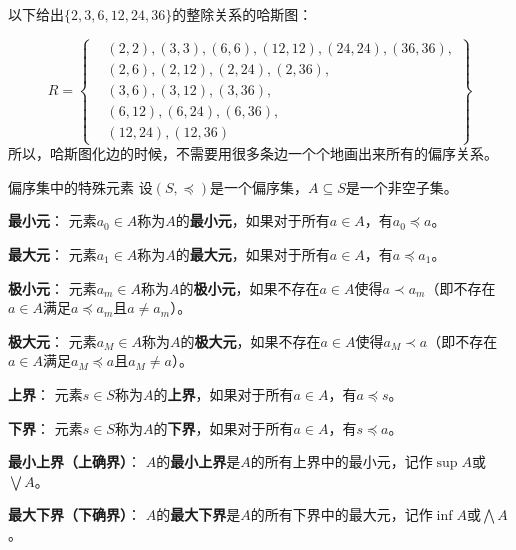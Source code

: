 以下给出$\{2,3,6,12,24,36\}$的整除关系的哈斯图：
\begin{figure}[!ht]
\centering
{}%
\end{figure}
\[
R = \left\{
\begin{aligned}
& (2,2), (3,3), (6,6), (12,12), (24,24), (36,36), \\
& (2,6), (2,12), (2,24), (2,36), \\
& (3,6), (3,12), (3,36), \\
& (6,12), (6,24), (6,36), \\
& (12,24), (12,36)
\end{aligned}
\right\}
\]
所以，哈斯图化边的时候，不需要用很多条边一个个地画出来所有的偏序关系。
\begin{definition}{偏序集中的特殊元素}{}
设$(S, \preccurlyeq)$是一个偏序集，$A \subseteq S$是一个非空子集。

\textbf{最小元}：
元素$a_0 \in A$称为$A$的\textbf{最小元}，如果对于所有$a \in A$，有$a_0 \preccurlyeq a$。

\textbf{最大元}：
元素$a_1 \in A$称为$A$的\textbf{最大元}，如果对于所有$a \in A$，有$a \preccurlyeq a_1$。

\textbf{极小元}：
元素$a_m \in A$称为$A$的\textbf{极小元}，如果不存在$a \in A$使得$a \prec a_m$（即不存在$a \in A$满足$a \preccurlyeq a_m$且$a \neq a_m$）。

\textbf{极大元}：
元素$a_M \in A$称为$A$的\textbf{极大元}，如果不存在$a \in A$使得$a_M \prec a$（即不存在$a \in A$满足$a_M \preccurlyeq a$且$a_M \neq a$）。

\textbf{上界}：
元素$s \in S$称为$A$的\textbf{上界}，如果对于所有$a \in A$，有$a \preccurlyeq s$。

\textbf{下界}：
元素$s \in S$称为$A$的\textbf{下界}，如果对于所有$a \in A$，有$s \preccurlyeq a$。

\textbf{最小上界（上确界）}：
$A$的\textbf{最小上界}是$A$的所有上界中的最小元，记作$\sup A$或$\bigvee A$。

\textbf{最大下界（下确界）}：
$A$的\textbf{最大下界}是$A$的所有下界中的最大元，记作$\inf A$或$\bigwedge A$。
\end{definition}
